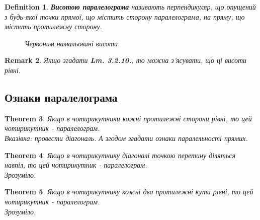 \documentclass[a4paper, 10pt]{article}
\theoremstyle{theoremdd}
\newtheorem{theorem}{Theorem}[subsection]
\theoremstyle{theoremdd}
\theoremstyle{theoremdd}
\newtheorem{definition}[theorem]{Definition}
\theoremstyle{theoremdd}
\theoremstyle{theoremdd}
\theoremstyle{theoremdd}
\theoremstyle{theoremdd}
\newtheorem{remark}[theorem]{Remark}
\theoremstyle{theoremdd}
\theoremstyle{theoremdd}
\begin{document}
\begin{definition}
\textbf{Висотою паралелограма} називають перпендикуляр, що опущений з будь-якої точки прямої, що містить сторону паралелограма, на пряму, що містить протилежну сторону.
\begin{figure}[H]
\centering
{}
\caption*{Червоним намальовані висоти.}
\end{figure}
\end{definition}

\begin{remark}
Якщо згадати \textbf{Lm. 3.2.10.}, то можна з'ясувати, що ці висоти рівні.
\end{remark}

\subsection{Ознаки паралелограма}
\begin{theorem}
Якщо в чотирикутники кожні протилежні сторони рівні, то цей чотирикутник - паралелограм.\\
\textit{Вказівка: провести діагональ. А згодом згадати ознаки паралельності прямих.}
\end{theorem}

\begin{theorem}
Якщо в чотирикутнику діагоналі точкою перетину діляться навпіл, то цей чотирикутник - паралелограм.\\
\textit{Зрозуміло.}
\end{theorem}

\begin{theorem}
Якщо в чотирикутнику кожні два протилежні кути рівні, то цей чотирикутник - паралелограм.\\
\textit{Зрозуміло.}
\end{theorem}
\end{document}
